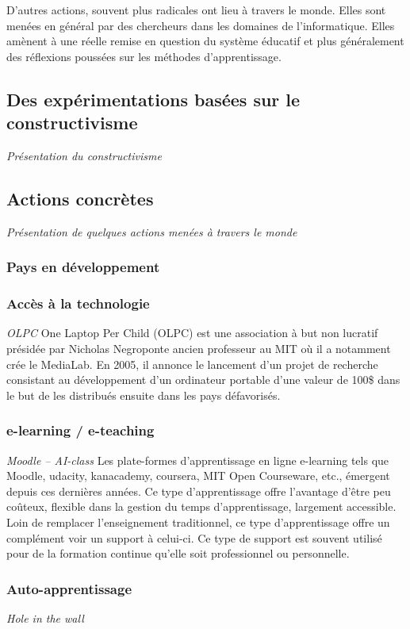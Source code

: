 D'autres actions, souvent plus radicales ont lieu à travers le monde. Elles sont menées en général par des chercheurs dans les domaines de l'informatique. Elles amènent à une réelle remise en question du système éducatif et plus généralement des réflexions poussées sur les méthodes d'apprentissage.

\subsection{Des expérimentations basées sur le constructivisme}
\textit{Présentation du constructivisme}

\subsection{Actions concrètes}
\textit{Présentation de quelques actions menées à travers le monde}
\subsubsection{Pays en développement}
\subsubsection{Accès à la technologie}
\textit{OLPC}
One Laptop Per Child (OLPC) est une association à but non lucratif
présidée par Nicholas Negroponte ancien professeur au MIT où il a
notamment crée le MediaLab. En 2005, il annonce le lancement d'un
projet de recherche consistant au développement d'un ordinateur
portable d'une valeur de 100\$ dans le but de les distribués ensuite
dans les pays défavorisés.

\subsubsection{e-learning / e-teaching}
\textit{Moodle -- AI-class}
Les plate-formes d'apprentissage en ligne \og{}e-learning\fg{} tels
que Moodle, udacity, kanacademy, coursera, MIT Open Courseware, etc.,
émergent depuis ces dernières années. Ce type d'apprentissage offre l'avantage d'être peu
coûteux, flexible dans la gestion du temps d'apprentissage, largement
accessible. Loin de remplacer l'enseignement traditionnel, ce type
d'apprentissage offre un complément voir un support à celui-ci. Ce
type de support est souvent utilisé pour de la formation continue
qu'elle soit professionnel ou personnelle.

\subsubsection{Auto-apprentissage}
\textit{Hole in the wall}

